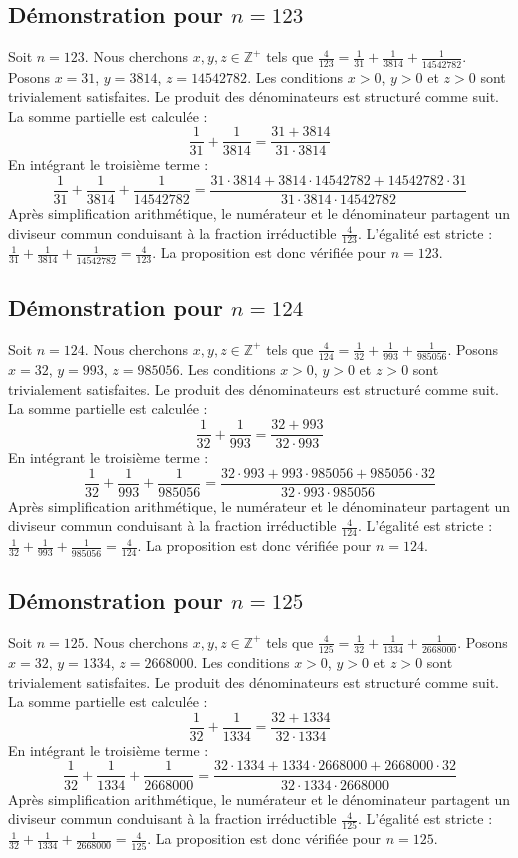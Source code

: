 \documentclass[11pt,a4paper]{article}
\begin{document}
\subsection{Démonstration pour $n = 123$}
Soit $n = 123$. Nous cherchons $x, y, z \in \mathbb{Z}^{+}$ tels que $\frac{4}{123} = \frac{1}{31} + \frac{1}{3814} + \frac{1}{14542782}$.
Posons $x = 31$, $y = 3814$, $z = 14542782$.
Les conditions $x > 0$, $y > 0$ et $z > 0$ sont trivialement satisfaites.
Le produit des dénominateurs est structuré comme suit. La somme partielle est calculée :
$$ \frac{1}{31} + \frac{1}{3814} = \frac{31+3814}{31 \cdot 3814} $$
En intégrant le troisième terme :
$$ \frac{1}{31} + \frac{1}{3814} + \frac{1}{14542782} = \frac{31 \cdot 3814 + 3814 \cdot 14542782 + 14542782 \cdot 31}{31 \cdot 3814 \cdot 14542782} $$
Après simplification arithmétique, le numérateur et le dénominateur partagent un diviseur commun conduisant à la fraction irréductible $\frac{4}{123}$.
L'égalité est stricte : $\frac{1}{31} + \frac{1}{3814} + \frac{1}{14542782} = \frac{4}{123}$.
La proposition est donc vérifiée pour $n = 123$.
\subsection{Démonstration pour $n = 124$}
Soit $n = 124$. Nous cherchons $x, y, z \in \mathbb{Z}^{+}$ tels que $\frac{4}{124} = \frac{1}{32} + \frac{1}{993} + \frac{1}{985056}$.
Posons $x = 32$, $y = 993$, $z = 985056$.
Les conditions $x > 0$, $y > 0$ et $z > 0$ sont trivialement satisfaites.
Le produit des dénominateurs est structuré comme suit. La somme partielle est calculée :
$$ \frac{1}{32} + \frac{1}{993} = \frac{32+993}{32 \cdot 993} $$
En intégrant le troisième terme :
$$ \frac{1}{32} + \frac{1}{993} + \frac{1}{985056} = \frac{32 \cdot 993 + 993 \cdot 985056 + 985056 \cdot 32}{32 \cdot 993 \cdot 985056} $$
Après simplification arithmétique, le numérateur et le dénominateur partagent un diviseur commun conduisant à la fraction irréductible $\frac{4}{124}$.
L'égalité est stricte : $\frac{1}{32} + \frac{1}{993} + \frac{1}{985056} = \frac{4}{124}$.
La proposition est donc vérifiée pour $n = 124$.
\subsection{Démonstration pour $n = 125$}
Soit $n = 125$. Nous cherchons $x, y, z \in \mathbb{Z}^{+}$ tels que $\frac{4}{125} = \frac{1}{32} + \frac{1}{1334} + \frac{1}{2668000}$.
Posons $x = 32$, $y = 1334$, $z = 2668000$.
Les conditions $x > 0$, $y > 0$ et $z > 0$ sont trivialement satisfaites.
Le produit des dénominateurs est structuré comme suit. La somme partielle est calculée :
$$ \frac{1}{32} + \frac{1}{1334} = \frac{32+1334}{32 \cdot 1334} $$
En intégrant le troisième terme :
$$ \frac{1}{32} + \frac{1}{1334} + \frac{1}{2668000} = \frac{32 \cdot 1334 + 1334 \cdot 2668000 + 2668000 \cdot 32}{32 \cdot 1334 \cdot 2668000} $$
Après simplification arithmétique, le numérateur et le dénominateur partagent un diviseur commun conduisant à la fraction irréductible $\frac{4}{125}$.
L'égalité est stricte : $\frac{1}{32} + \frac{1}{1334} + \frac{1}{2668000} = \frac{4}{125}$.
La proposition est donc vérifiée pour $n = 125$.
\end{document}

